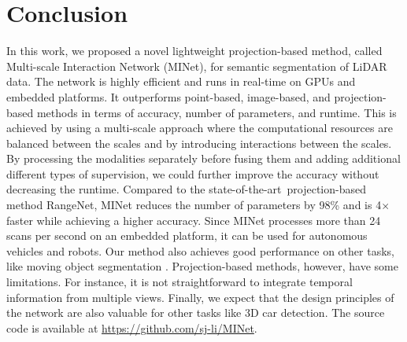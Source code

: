 \documentclass[letterpaper, 10 pt, journal, twoside]{ieeetran}
\def\sArt{{state-of-the-art~}}
\begin{document}
\section{Conclusion}
In this work, we proposed a novel lightweight projection-based method, called Multi-scale Interaction Network (MINet), for semantic segmentation of LiDAR data. 
The network is highly efficient and runs in real-time on GPUs and embedded platforms. 
It outperforms point-based, image-based, and projection-based methods in terms of accuracy, number of parameters, and runtime. 
This is achieved by using a multi-scale approach where the computational resources are balanced between the scales and by introducing interactions between the scales. 
By processing the modalities separately before fusing them and adding additional different types of supervision, we could further improve the accuracy without decreasing the runtime. 
Compared to the \sArt projection-based method RangeNet, MINet reduces the number of parameters by 98\% and is 4$\times$ faster while achieving a higher accuracy. 
Since MINet processes more than 24 scans per second on an embedded platform, it can be used for autonomous vehicles and robots.
Our method also achieves good performance on other tasks, like moving object segmentation \cite{chen2021ral}.
Projection-based methods, however, have some limitations. For instance, it is not straightforward to integrate temporal information from multiple views. Finally, we expect that the design principles of the network are also valuable for other tasks like 3D car detection. The source code is available at \url{https://github.com/sj-li/MINet}.













\end{document}
